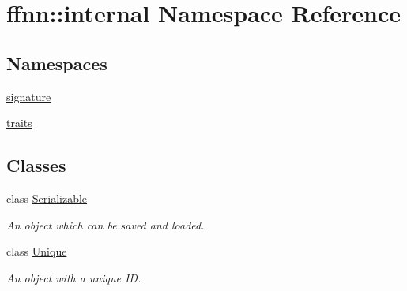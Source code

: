 \hypertarget{namespaceffnn_1_1internal}{\section{ffnn\-:\-:internal Namespace Reference}
\label{namespaceffnn_1_1internal}
}
\subsection*{Namespaces}
\begin{DoxyCompactItemize}
\item 
\hyperlink{namespaceffnn_1_1internal_1_1signature}{signature}
\item 
\hyperlink{namespaceffnn_1_1internal_1_1traits}{traits}
\end{DoxyCompactItemize}
\subsection*{Classes}
\begin{DoxyCompactItemize}
\item 
class \hyperlink{classffnn_1_1internal_1_1_serializable}{Serializable}
\begin{DoxyCompactList}\small\item\em An object which can be saved and loaded. \end{DoxyCompactList}\item 
class \hyperlink{classffnn_1_1internal_1_1_unique}{Unique}
\begin{DoxyCompactList}\small\item\em An object with a unique I\-D. \end{DoxyCompactList}\end{DoxyCompactItemize}
